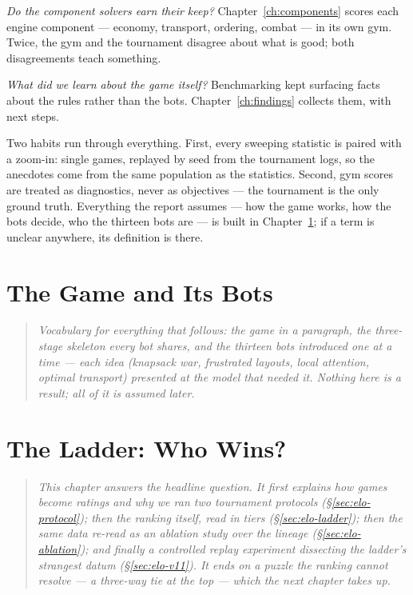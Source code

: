 \documentclass[11pt]{report}
\newcommand{\chapterlead}[1]{%
  \begin{quote}\itshape #1\end{quote}\medskip}
\begin{document}
\emph{Do the component solvers earn their keep?} Chapter~\ref{ch:components}
scores each engine component --- economy, transport, ordering, combat ---
in its own gym. Twice, the gym and the tournament disagree about what is
good; both disagreements teach something.

\emph{What did we learn about the game itself?} Benchmarking kept surfacing
facts about the rules rather than the bots. Chapter~\ref{ch:findings}
collects them, with next steps.

Two habits run through everything. First, every sweeping statistic is
paired with a zoom-in: single games, replayed by seed from the tournament
logs, so the anecdotes come from the same population as the statistics.
Second, gym scores are treated as diagnostics, never as objectives --- the
tournament is the only ground truth. Everything the report assumes --- how
the game works, how the bots decide, who the thirteen bots are --- is built
in Chapter~\ref{ch:background}; if a term is unclear anywhere, its
definition is there.

\chapter{The Game and Its Bots}
\label{ch:background}
\chapterlead{Vocabulary for everything that follows: the game in a
paragraph, the three-stage skeleton every bot shares, and the thirteen bots
introduced one at a time --- each idea (knapsack war, frustrated layouts,
local attention, optimal transport) presented at the model that needed it.
Nothing here is a result; all of it is assumed later.}


\chapter{The Ladder: Who Wins?}
\label{ch:ladder}
\chapterlead{This chapter answers the headline question. It first explains
how games become ratings and why we ran two tournament protocols
(\S\ref{sec:elo-protocol}); then the ranking itself, read in tiers
(\S\ref{sec:elo-ladder}); then the same data re-read as an ablation study
over the lineage (\S\ref{sec:elo-ablation}); and finally a controlled
replay experiment dissecting the ladder's strangest datum
(\S\ref{sec:elo-v11}). It ends on a puzzle the ranking cannot resolve ---
a three-way tie at the top --- which the next chapter takes up.}

\end{document}
